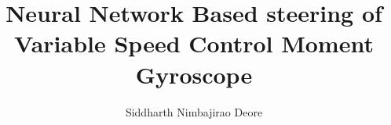 \documentclass[oneside,LaM,binding=0.0cm]{sapthesis}
\title{Neural Network Based steering of \\ Variable Speed Control Moment Gyroscope}
\author{Siddharth Nimbajirao Deore}
\begin{document}
\frontmatter
\maketitle

\begin{comment}
\dedication{Dedicated to\\ Aai and Aaba}

\begin{abstract}
\phantomsection
\addcontentsline{toc}{chapter}{Abstract}
This document is an example which shows the main features of
the \LaTeXe\ class \texttt{sapthesis.cls} developed by Siddharth Nimbajirao Deore
with the help of GuIT (Gruppo Utilizzatori Italiani di \TeX).
\end{abstract}

\begin{acknowledgments}
\phantomsection
\addcontentsline{toc}{chapter}{Acknowledgments}
Sab ki dua
\end{acknowledgments}

\newglossaryentry{policy}{
    name = policy,
    description = neural network which produces appropriate actions.
}



\renewcommand{\contentsname}{Table of Contents}
\tableofcontents

\listoftables
\addcontentsline{toc}{chapter}{\listtablename}

\listoffigures
\addcontentsline{toc}{chapter}{\listfigurename}

\printglossary[type=\acronymtype, title=List of Acronyms]
\addcontentsline{toc}{chapter}{List of Acronyms}

\printglossary[title=List of Terms]
\addcontentsline{toc}{chapter}{List of Terms}

\renewcommand{\nomname}{List of Abbreviations}
\printnomenclature
\addcontentsline{toc}{chapter}{List of Abbreviations}










\chapter{No Numbered Chapter}


\end{comment}
\end{document}
